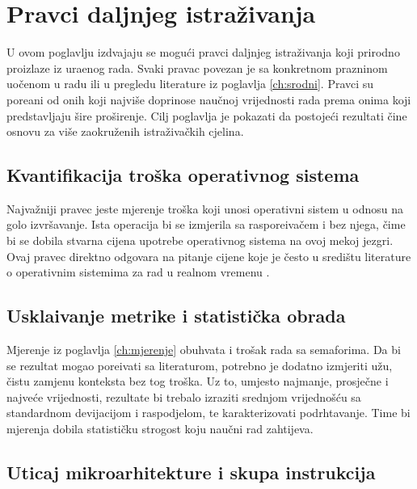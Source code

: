 \chapter{Pravci daljnjeg istra\v{z}ivanja}
\label{ch:pravci}

U ovom poglavlju izdvajaju se mogu\'ci pravci daljnjeg istra\v{z}ivanja koji
prirodno proizlaze iz ura\dj{}enog rada. Svaki pravac povezan je sa konkretnom
prazninom uo\v{c}enom u radu ili u pregledu literature iz poglavlja
\ref{ch:srodni}. Pravci su pore\dj{}ani od onih koji najvi\v{s}e doprinose
nau\v{c}noj vrijednosti rada prema onima koji predstavljaju \v{s}ire pro\v{s}irenje.
Cilj poglavlja je pokazati da postoje\'ci rezultati \v{c}ine osnovu za vi\v{s}e
zaokru\v{z}enih istra\v{z}iva\v{c}kih cjelina.

\section{Kvantifikacija tro\v{s}ka operativnog sistema}
\label{sec:pravci-overhead}

Najva\v{z}niji pravec jeste mjerenje tro\v{s}ka koji unosi operativni sistem u
odnosu na golo izvr\v{s}avanje. Ista operacija bi se izmjerila sa raspore\dj{}iva\v{c}em
i bez njega, \v{c}ime bi se dobila stvarna cijena upotrebe operativnog sistema na
ovoj mekoj jezgri. Ovaj pravec direktno odgovara na pitanje cijene koje je
\v{c}esto u sredi\v{s}tu literature o operativnim sistemima za rad u realnom
vremenu \citep{ulsolutions2022rtos}.

\section{Uskla\dj{}ivanje metrike i statisti\v{c}ka obrada}
\label{sec:pravci-metrika}

Mjerenje iz poglavlja \ref{ch:mjerenje} obuhvata i tro\v{s}ak rada sa semaforima.
Da bi se rezultat mogao pore\dj{}ivati sa literaturom, potrebno je dodatno
izmjeriti u\v{z}u, \v{c}istu zamjenu konteksta bez tog tro\v{s}ka. Uz to, umjesto
najmanje, prosje\v{c}ne i najve\'ce vrijednosti, rezultate bi trebalo izraziti
srednjom vrijedno\v{s}\'cu sa standardnom devijacijom i raspodjelom, te
karakterizovati podrhtavanje. Time bi mjerenja dobila statisti\v{c}ku strogost
koju nau\v{c}ni rad zahtijeva.

\section{Uticaj mikroarhitekture i skupa instrukcija}
\label{sec:pravci-mikroarhitektura}


